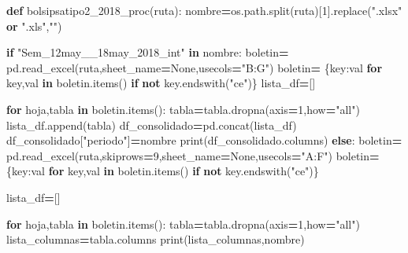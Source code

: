 \documentclass[
]{book}
\newenvironment{Shaded}{\begin{snugshade}}{\end{snugshade}}
\newcommand{\BuiltInTok}[1]{#1}
\newcommand{\ControlFlowTok}[1]{\textcolor[rgb]{0.13,0.29,0.53}{\textbf{#1}}}
\newcommand{\DecValTok}[1]{\textcolor[rgb]{0.00,0.00,0.81}{#1}}
\newcommand{\KeywordTok}[1]{\textcolor[rgb]{0.13,0.29,0.53}{\textbf{#1}}}
\newcommand{\NormalTok}[1]{#1}
\newcommand{\OperatorTok}[1]{\textcolor[rgb]{0.81,0.36,0.00}{\textbf{#1}}}
\newcommand{\StringTok}[1]{\textcolor[rgb]{0.31,0.60,0.02}{#1}}
\newcommand{\VariableTok}[1]{\textcolor[rgb]{0.00,0.00,0.00}{#1}}
\begin{document}
\begin{Shaded}
\begin{Highlighting}[]

\KeywordTok{def}\NormalTok{ bolsipsatipo2\_2018\_proc(ruta):}
\NormalTok{    nombre}\OperatorTok{=}\NormalTok{os.path.split(ruta)[}\DecValTok{1}\NormalTok{].replace(}\StringTok{".xlsx"} \KeywordTok{or} \StringTok{".xls"}\NormalTok{,}\StringTok{""}\NormalTok{)}
    
    \ControlFlowTok{if} \StringTok{"Sem\_12may\_\_18may\_2018\_int"} \KeywordTok{in}\NormalTok{ nombre:}
\NormalTok{        boletin}\OperatorTok{=}\NormalTok{ pd.read\_excel(ruta,sheet\_name}\OperatorTok{=}\VariableTok{None}\NormalTok{,usecols}\OperatorTok{=}\StringTok{"B:G"}\NormalTok{)}
\NormalTok{        boletin}\OperatorTok{=}\NormalTok{ \{key:val }\ControlFlowTok{for}\NormalTok{ key,val }\KeywordTok{in}\NormalTok{ boletin.items() }\ControlFlowTok{if} \KeywordTok{not}\NormalTok{ key.endswith(}\StringTok{"ce"}\NormalTok{)\}}
\NormalTok{        lista\_df}\OperatorTok{=}\NormalTok{[]}
        
        \ControlFlowTok{for}\NormalTok{ hoja,tabla }\KeywordTok{in}\NormalTok{ boletin.items():}
\NormalTok{            tabla}\OperatorTok{=}\NormalTok{tabla.dropna(axis}\OperatorTok{=}\DecValTok{1}\NormalTok{,how}\OperatorTok{=}\StringTok{"all"}\NormalTok{)}
\NormalTok{            lista\_df.append(tabla)}
\NormalTok{            df\_consolidado}\OperatorTok{=}\NormalTok{pd.concat(lista\_df)}
\NormalTok{            df\_consolidado[}\StringTok{"periodo"}\NormalTok{]}\OperatorTok{=}\NormalTok{nombre}
            \BuiltInTok{print}\NormalTok{(df\_consolidado.columns)}
    \ControlFlowTok{else}\NormalTok{:}
\NormalTok{        boletin}\OperatorTok{=}\NormalTok{ pd.read\_excel(ruta,skiprows}\OperatorTok{=}\DecValTok{9}\NormalTok{,sheet\_name}\OperatorTok{=}\VariableTok{None}\NormalTok{,usecols}\OperatorTok{=}\StringTok{"A:F"}\NormalTok{)}
\NormalTok{        boletin}\OperatorTok{=}\NormalTok{ \{key:val }\ControlFlowTok{for}\NormalTok{ key,val }\KeywordTok{in}\NormalTok{ boletin.items() }\ControlFlowTok{if} \KeywordTok{not}\NormalTok{ key.endswith(}\StringTok{"ce"}\NormalTok{)\}}
    
\NormalTok{        lista\_df}\OperatorTok{=}\NormalTok{[]}
    
        \ControlFlowTok{for}\NormalTok{ hoja,tabla }\KeywordTok{in}\NormalTok{ boletin.items():}
\NormalTok{            tabla}\OperatorTok{=}\NormalTok{tabla.dropna(axis}\OperatorTok{=}\DecValTok{1}\NormalTok{,how}\OperatorTok{=}\StringTok{"all"}\NormalTok{)}
\NormalTok{            lista\_columnas}\OperatorTok{=}\NormalTok{tabla.columns}
            \BuiltInTok{print}\NormalTok{(lista\_columnas,nombre)}
            

\end{Highlighting}
\end{Shaded}
\end{document}
